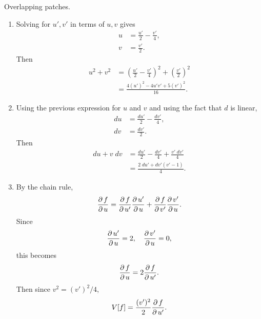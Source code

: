 \documentclass[twoside,10pt]{report}
\begin{document}
\newpage
\begin{exer}[]
Overlapping patches.
\end{exer}
\begin{enumerate}
	\item Solving for $u',v'$ in terms of $u,v$ gives
		\begin{align*}
			u&= \frac{u'}{2} -\frac{v'}{4} ,\\
			v&= \frac{v'}{2} .
		\end{align*}
		Then
		\begin{align*}
			u^{2}+v^2&=\left( \frac{u'}{2} -\frac{v'}{4} \right)^2+\left( \frac{v'}{2} \right)^2 \\
				 &= \frac{4(u')^2-4u'v'+5(v')^2}{16}.
		\end{align*}

	\item Using the previous expression for $u$ and $v$ and using the fact that $d$ is linear,
		\begin{align*}
			du &= \frac{du'}{2} -\frac{dv'}{4} ,\\
			dv &= \frac{dv'}{2} .
		\end{align*}
		Then
		\begin{align*}
			du+v\;dv &= \frac{du'}{2} -\frac{dv'}{4} + \frac{v'\;dv'}{4} \\
				 &= \frac{2\;du'+dv'(v'-1)}{4} .
		\end{align*}
	
	\item By the chain rule,
		\[
		\frac{\operatorname{\partial} f}{\operatorname{\partial} u} =\frac{\operatorname{\partial} f}{\operatorname{\partial} u'} \frac{\operatorname{\partial} u'}{\operatorname{\partial} u} +\frac{\operatorname{\partial} f}{\operatorname{\partial} v'} \frac{\operatorname{\partial} v'}{\operatorname{\partial} u} .
		\] 
		Since
		\[
		\frac{\operatorname{\partial} u'}{\operatorname{\partial} u} =2, \quad \frac{\operatorname{\partial} v'}{\operatorname{\partial} u} =0,
		\] this becomes
		\[
		\frac{\operatorname{\partial} f}{\operatorname{\partial} u} = 2\frac{\operatorname{\partial} f}{\operatorname{\partial} u'} .
	\] Then since $v^2=(v')^2/4$,
		\[
			V[f] = \frac{(v')^{2}}{2} \frac{\operatorname{\partial} f}{\operatorname{\partial} u'} .
		\] 
\end{enumerate}
\end{document}
